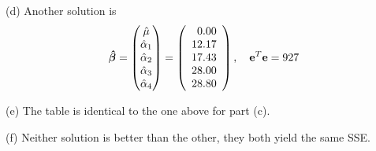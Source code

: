 \bigskip
\noindent
(d) Another solution is
$$\bm{\hat\beta}=
\begin{pmatrix}
\hat\mu\cr
\hat\alpha_1\cr
\hat\alpha_2\cr
\hat\alpha_3\cr
\hat\alpha_4
\end{pmatrix}=
\left(
\begin{array}{r}
0.00\\
12.17\\
17.43\\
28.00\\
28.80
\end{array}
\right),\quad
\mathbf e^T\mathbf e=927
$$

\bigskip
\noindent
(e) The table is identical to the one above for part (c).

\bigskip
\noindent
(f) Neither solution is better than the other,
they both yield the same SSE.

